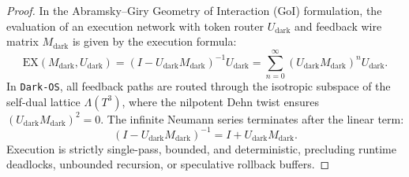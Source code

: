 \documentclass[11pt,onecolumn]{article}
\begin{document}
\begin{proof}
In the Abramsky--Giry Geometry of Interaction (GoI) formulation, the evaluation of an execution network with token router $U_{\text{dark}}$ and feedback wire matrix $M_{\text{dark}}$ is given by the execution formula:
\begin{equation}
\mathrm{EX}(M_{\text{dark}}, U_{\text{dark}}) = (I - U_{\text{dark}} M_{\text{dark}})^{-1} U_{\text{dark}} = \sum_{n=0}^\infty (U_{\text{dark}} M_{\text{dark}})^n U_{\text{dark}}.
\end{equation}
In \texttt{Dark-OS}, all feedback paths are routed through the isotropic subspace of the self-dual lattice $\Lambda(T^3)$, where the nilpotent Dehn twist ensures $(U_{\text{dark}} M_{\text{dark}})^2 = 0$. The infinite Neumann series terminates after the linear term:
\begin{equation}
(I - U_{\text{dark}} M_{\text{dark}})^{-1} = I + U_{\text{dark}} M_{\text{dark}}.
\end{equation}
Execution is strictly single-pass, bounded, and deterministic, precluding runtime deadlocks, unbounded recursion, or speculative rollback buffers.


\end{proof}
\end{document}
